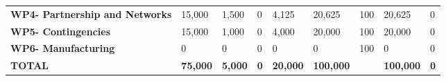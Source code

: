 \begin{landscape}
\begin{table}[H]
{\begin{tabular}{p{5cm}p{2cm}p{2cm}p{2.5cm}p{2cm}p{2cm}p{2cm}p{2cm}p{2cm}}
    \textbf{WP4- Partnership and Networks} & 15,000                                                                 & 1,500                                                              & 0                                                                               & 4,125                                                                        & 20,625                                                                                        & 100                          & 20,625                          & 0                                                                         \\
    \textbf{WP5- Contingencies}                                                        & 15,000                                                                 & 1,000                                                              & 0                                                                               & 4,000                                                                        & 20,000                                                                                        & 100                          & 20,000                          & 0                                                                         \\
    \textbf{WP6- Manufacturing}                                                        & 0                                                                      & 0                                                                  & 0                                                                               & 0                                                                            & 0                                                                                             & 100                          & 0                               & 0                                                                         \\ \hline
    \textbf{TOTAL}                                                                     & \textbf{75,000}                                                        & \textbf{5,000}                                                     & \textbf{0}                                                                      & \textbf{20,000}                                                              & \textbf{100,000}                                                                              & \textbf{}                    & \textbf{100,000}                & \textbf{0}                                                               
    \\ \bottomrule[2pt]
    \end{tabular} }
    \end{table}



\end{landscape}
